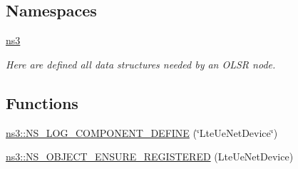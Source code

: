 \subsection*{Namespaces}
\begin{DoxyCompactItemize}
\item 
 \hyperlink{namespacens3}{ns3}
\begin{DoxyCompactList}\small\item\em Here are defined all data structures needed by an O\+L\+SR node. \end{DoxyCompactList}\end{DoxyCompactItemize}
\subsection*{Functions}
\begin{DoxyCompactItemize}
\item 
\hyperlink{namespacens3_ad66b7488898ead8dda6b823e69590121}{ns3\+::\+N\+S\+\_\+\+L\+O\+G\+\_\+\+C\+O\+M\+P\+O\+N\+E\+N\+T\+\_\+\+D\+E\+F\+I\+NE} (\char`\"{}Lte\+Ue\+Net\+Device\char`\"{})
\item 
\hyperlink{namespacens3_a748157d59a65eed1a9d9c0171168da86}{ns3\+::\+N\+S\+\_\+\+O\+B\+J\+E\+C\+T\+\_\+\+E\+N\+S\+U\+R\+E\+\_\+\+R\+E\+G\+I\+S\+T\+E\+R\+ED} (Lte\+Ue\+Net\+Device)
\end{DoxyCompactItemize}
